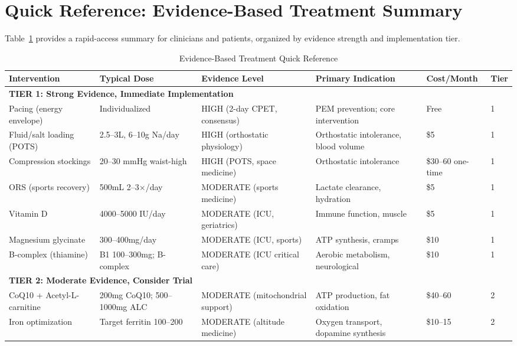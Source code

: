 \section{Quick Reference: Evidence-Based Treatment Summary}
\label{sec:evidence-based-summary}

Table~\ref{tab:treatment-quick-reference} provides a rapid-access summary for clinicians and patients, organized by evidence strength and implementation tier.

\begin{table}[htbp]
\centering
\caption{Evidence-Based Treatment Quick Reference}
\label{tab:treatment-quick-reference}
\scriptsize
\begin{tabular}{p{3cm}p{2cm}p{2.5cm}p{3cm}p{2cm}p{1.5cm}}
\toprule
\textbf{Intervention} & \textbf{Typical Dose} & \textbf{Evidence Level} & \textbf{Primary Indication} & \textbf{Cost/Month} & \textbf{Tier} \\
\midrule
\multicolumn{6}{l}{\textbf{TIER 1: Strong Evidence, Immediate Implementation}} \\
\midrule
Pacing (energy envelope) & Individualized & HIGH (2-day CPET, consensus) & PEM prevention; core intervention & Free & 1 \\
Fluid/salt loading (POTS) & 2.5--3L, 6--10g Na/day & HIGH (orthostatic physiology) & Orthostatic intolerance, blood volume & \$5 & 1 \\
Compression stockings & 20--30 mmHg waist-high & HIGH (POTS, space medicine) & Orthostatic intolerance & \$30--60 one-time & 1 \\
ORS (sports recovery) & 500mL 2--3$\times$/day & MODERATE (sports medicine) & Lactate clearance, hydration & \$5 & 1 \\
Vitamin D & 4000--5000 IU/day & MODERATE (ICU, geriatrics) & Immune function, muscle & \$5 & 1 \\
Magnesium glycinate & 300--400mg/day & MODERATE (ICU, sports) & ATP synthesis, cramps & \$10 & 1 \\
B-complex (thiamine) & B1 100--300mg; B-complex & MODERATE (ICU critical care) & Aerobic metabolism, neurological & \$10 & 1 \\
\midrule
\multicolumn{6}{l}{\textbf{TIER 2: Moderate Evidence, Consider Trial}} \\
\midrule
CoQ10 + Acetyl-L-carnitine & 200mg CoQ10; 500--1000mg ALC & MODERATE (mitochondrial support) & ATP production, fat oxidation & \$40--60 & 2 \\
Iron optimization & Target ferritin 100--200 & MODERATE (altitude medicine) & Oxygen transport, dopamine synthesis & \$10--15 & 2 \\

\end{tabular}
\end{table}
